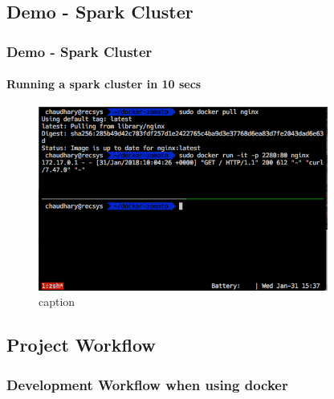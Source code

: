 \documentclass[mathserif,serif]{beamer}
\begin{document}
    \subsection{Demo - Spark Cluster}\label{subsec:demo-SparkCluster}
    \begin{frame}
        \frametitle{Demo - Spark Cluster}
        \framesubtitle{Running a spark cluster in 10 secs}
        \begin{figure}[h!]
            \centering
            \includegraphics[height=0.75\textheight,width=0.85\textwidth]{docker-zomato/images/nginx.png}
            \caption{caption}
        \end{figure}
    \end{frame}

    \subsection{Project Workflow}\label{subsec:basicWorkflow}
    \begin{frame}
        \frametitle{Development Workflow when using docker}
        \begin{center}
        \end{center}
    \end{frame}
\end{document}
